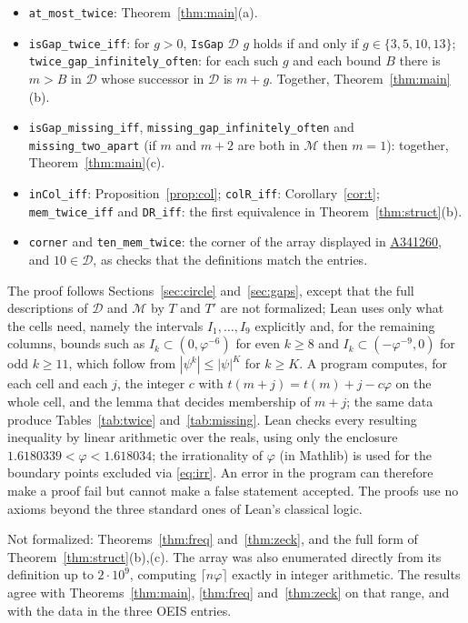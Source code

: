 \documentclass[12pt]{article}
\newcommand{\seqnum}[1]{\href{https://oeis.org/#1}{\underline{#1}}}
\newcommand{\cl}[1]{\lceil #1 \rceil}
\newcommand{\D}{\mathcal{D}}
\newcommand{\M}{\mathcal{M}}
\theoremstyle{plain}
\theoremstyle{remark}
\begin{document}
\begin{itemize}
\item \texttt{at\_most\_twice}: Theorem~\ref{thm:main}(a).
\item \texttt{isGap\_twice\_iff}: for $g>0$, \texttt{IsGap} $\D$ $g$ holds if and only if
$g\in\{3,5,10,13\}$; \texttt{twice\_gap\_infinitely\_often}: for each such $g$ and each bound $B$
there is $m>B$ in $\D$ whose successor in $\D$ is $m+g$. Together, Theorem~\ref{thm:main}(b).
\item \texttt{isGap\_missing\_iff}, \texttt{missing\_gap\_infinitely\_often} and
\texttt{missing\_two\_apart} (if $m$ and $m+2$ are both in $\M$ then $m=1$): together,
Theorem~\ref{thm:main}(c).
\item \texttt{inCol\_iff}: Proposition~\ref{prop:col}; \texttt{colR\_iff}:
Corollary~\ref{cor:t}; \texttt{mem\_twice\_iff} and \texttt{DR\_iff}: the first equivalence in
Theorem~\ref{thm:struct}(b).
\item \texttt{corner} and \texttt{ten\_mem\_twice}: the corner of the array displayed in
\seqnum{A341260}, and $10\in\D$, as checks that the definitions match the entries.
\end{itemize}

The proof follows Sections~\ref{sec:circle} and~\ref{sec:gaps}, except that the full
descriptions of $\D$ and $\M$ by $T$ and $T'$ are not formalized; Lean uses only what the cells
need, namely the intervals $I_1,\dots,I_9$ explicitly and, for the remaining columns, bounds
such as $I_k\subset(0,\varphi^{-6})$ for even $k\ge8$ and $I_k\subset(-\varphi^{-9},0)$ for odd
$k\ge11$, which follow from $|\psi^k|\le|\psi|^K$ for $k\ge K$.
A program computes, for each cell and each $j$, the integer $c$ with
$t(m+j)=t(m)+j-c\varphi$ on the whole cell, and the lemma that decides membership of $m+j$; the
same data produce Tables~\ref{tab:twice} and~\ref{tab:missing}. Lean checks every resulting
inequality by linear arithmetic over the reals, using only the enclosure
$1.6180339<\varphi<1.618034$; the irrationality of $\varphi$ (in Mathlib) is used for the
boundary points excluded via \eqref{eq:irr}. An error in the program can therefore make a proof
fail but cannot make a false statement accepted. The proofs use no axioms beyond the three
standard ones of Lean's classical logic.

Not formalized: Theorems~\ref{thm:freq} and~\ref{thm:zeck}, and the full form of
Theorem~\ref{thm:struct}(b),(c). The array was also enumerated directly from its definition up to
$2\cdot10^9$, computing $\cl{n\varphi}$ exactly in integer arithmetic. The results agree with
Theorems~\ref{thm:main}, \ref{thm:freq} and~\ref{thm:zeck} on that range, and with the data in the
three OEIS entries.
\end{document}
